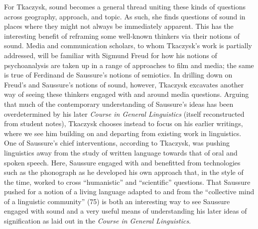 \documentclass{tufte-handout}
\begin{document}
For Tkaczysk, sound becomes a general thread uniting these kinds of
questions across geography, approach, and topic. As such, she finds
questions of sound in places where they might not always be immediately
apparent. This has the interesting benefit of reframing some well-known
thinkers via their notions of sound. Media and communication scholars,
to whom Tkaczysk's work is partially addressed, will be familiar with
Sigmund Freud for how his notions of psychoanalysis are taken up in a
range of approaches to film and media; the same is true of Ferdinand de
Saussure's notions of semiotics. In drilling down on Freud's and
Saussure's notions of sound, however, Tkaczysk excavates another way of
seeing these thinkers engaged with and around media questions. Arguing
that much of the contemporary understanding of Saussure's ideas has been
overdetermined by his later \emph{Course in General Linguistics} (itself
reconstructed from student notes), Tkaczysk chooses instead to focus on
his earlier writings, where we see him building on and departing from
existing work in linguistics. One of Saussure's chief interventions,
according to Tkaczysk, was pushing linguistics away from the study of
written language towards that of oral and spoken speech. Here, Saussure
engaged with and benefitted from technologies such as the phonograph as
he developed his own approach that, in the style of the time, worked to
cross ``humanistic'' and ``scientific'' questions. That Saussure pushed
for a notion of a living language adapted to and from the ``collective
mind of a linguistic community'' (75) is both an interesting way to see
Saussure engaged with sound and a very useful means of understanding his
later ideas of signification as laid out in the \emph{Course in General
Linguistics}.
\end{document}
